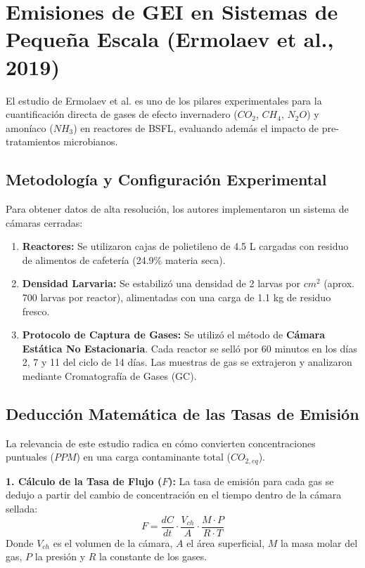 \documentclass{article}
\begin{document}
\section{Emisiones de GEI en Sistemas de Pequeña Escala (Ermolaev et al., 2019)}

El estudio de Ermolaev et al. es uno de los pilares experimentales para la cuantificación directa de gases de efecto invernadero ($CO_2$, $CH_4$, $N_2O$) y amoníaco ($NH_3$) en reactores de BSFL, evaluando además el impacto de pre-tratamientos microbianos.

\subsection{Metodología y Configuración Experimental}
Para obtener datos de alta resolución, los autores implementaron un sistema de cámaras cerradas:
\begin{enumerate}
    \item \textbf{Reactores:} Se utilizaron cajas de polietileno de 4.5 L cargadas con residuo de alimentos de cafetería (24.9\% materia seca).
    \item \textbf{Densidad Larvaria:} Se estabilizó una densidad de 2 larvas por $cm^2$ (aprox. 700 larvas por reactor), alimentadas con una carga de 1.1 kg de residuo fresco.
    \item \textbf{Protocolo de Captura de Gases:} Se utilizó el método de \textbf{Cámara Estática No Estacionaria}. Cada reactor se selló por 60 minutos en los días 2, 7 y 11 del ciclo de 14 días. Las muestras de gas se extrajeron y analizaron mediante Cromatografía de Gases (GC).
\end{enumerate}

\subsection{Deducción Matemática de las Tasas de Emisión}
La relevancia de este estudio radica en cómo convierten concentraciones puntuales ($PPM$) en una carga contaminante total ($CO_{2,eq}$).

\textbf{1. Cálculo de la Tasa de Flujo ($F$):}
La tasa de emisión para cada gas se dedujo a partir del cambio de concentración en el tiempo dentro de la cámara sellada:
\begin{equation}
    F = \frac{dC}{dt} \cdot \frac{V_{ch}}{A} \cdot \frac{M \cdot P}{R \cdot T}
\end{equation}
Donde $V_{ch}$ es el volumen de la cámara, $A$ el área superficial, $M$ la masa molar del gas, $P$ la presión y $R$ la constante de los gases. 
\end{document}
